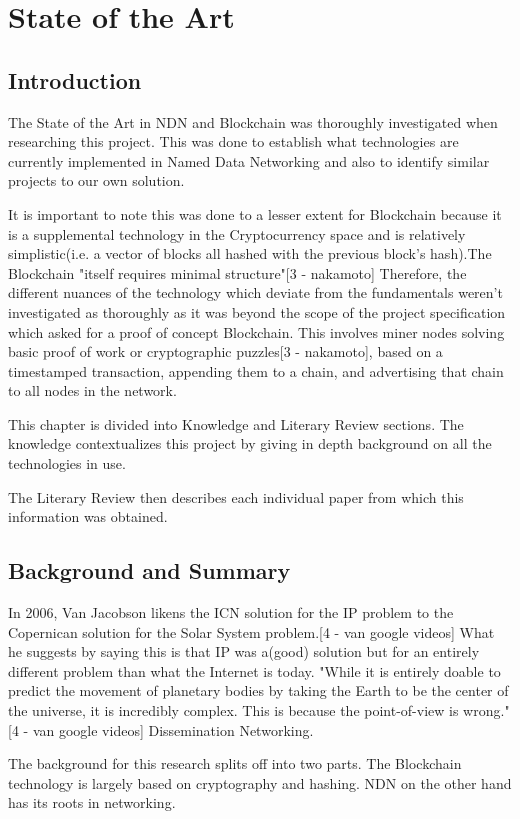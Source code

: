 \chapter{State of the Art}
\section{{Introduction}}
The State of the Art in NDN and Blockchain was thoroughly investigated when researching this project. This was done to establish what technologies are currently implemented in Named Data Networking and also to identify similar projects to our own solution.\par It is important to note this was done to a lesser extent for Blockchain because it is a supplemental technology in the Cryptocurrency space and is relatively simplistic(i.e. a vector of blocks all hashed with the previous block's hash).The Blockchain "itself requires minimal structure"[3 - nakamoto] Therefore, the different nuances of the technology which deviate from the fundamentals weren't investigated as thoroughly as it was beyond the scope of the project specification which asked for a proof of concept Blockchain. This involves miner nodes solving basic proof of work or cryptographic puzzles[3 - nakamoto], based on a timestamped transaction, appending them to a chain, and advertising that chain to all nodes in the network. 

This chapter is divided into Knowledge and Literary Review sections. The knowledge contextualizes this project by giving in depth background on all the technologies in use. 

The Literary Review then describes each individual paper from which this information was obtained. 

\section{Background and Summary}
In 2006, Van Jacobson likens the ICN solution for the IP problem to the Copernican solution for the Solar System problem.[4 - van google videos] What he suggests by saying this is that IP was a(good) solution but for an entirely different problem than what the Internet is today. "While it is entirely doable to predict the movement of planetary bodies by taking the Earth to be the center of the universe, it is incredibly complex. This is because the point-of-view is wrong." [4 - van google videos] Dissemination Networking.

The background for this research splits off into two parts. The Blockchain technology is largely based on cryptography and hashing. NDN on the other hand has its roots in networking. 

